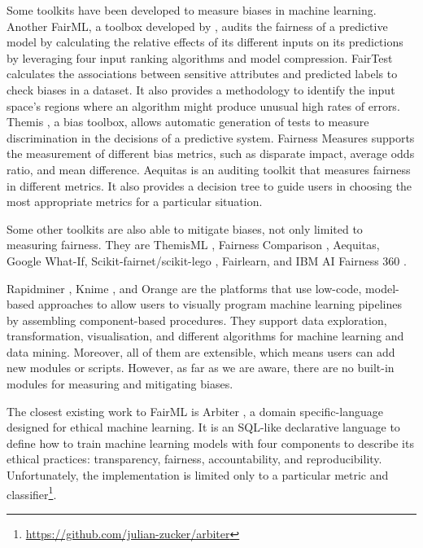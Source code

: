 \documentclass[sigconf,review]{acmart}
\begin{document}
Some toolkits have been developed to measure biases in machine learning. 
Another FairML, a toolbox developed by \cite{adebayo2016fairml}, audits the fairness of a predictive model by calculating the relative effects of its different inputs on its predictions by leveraging four input ranking algorithms and model compression. 
FairTest \cite{tramer2017fairtest} calculates the associations between sensitive attributes and predicted labels to check biases in a dataset. It also provides a methodology to identify the input space's regions where an algorithm might produce unusual high rates of errors.
Themis \cite{galhotra2017themis}, a bias toolbox, allows automatic generation of tests to measure discrimination in the decisions of a predictive system.
Fairness Measures \cite{zehlike2017fairness} supports the measurement of different bias metrics, such as disparate impact, average odds ratio, and mean difference. 
Aequitas \cite{saleiro2019aequitas} is an auditing toolkit that measures fairness in different metrics. It also provides a decision tree to guide users in choosing the most appropriate metrics for a particular situation. 

Some other toolkits are also able to mitigate biases, not only limited to measuring fairness. They are ThemisML \cite{bantilan2018themis}, Fairness Comparison \cite{friedler2019fairness}, Aequitas\cite{saleiro2019aequitas}, Google What-If\cite{googlewhatif2020}, Scikit-fairnet/scikit-lego \cite{scikitfairness2022,scikitlego2022}, Fairlearn\cite{bird2020fairlearn}, and IBM AI Fairness 360 \cite{bellamy2018ai}.

Rapidminer \cite{hofmann2016rapidminer}, Knime \cite{berthold2008knime}, and Orange \cite{demsar2013orange} are the platforms that use low-code, model-based approaches to allow users to visually program machine learning pipelines by assembling component-based procedures. They support data exploration, transformation, visualisation, and different algorithms for machine learning and data mining. Moreover, all of them are extensible, which means users can add new modules or scripts. However, as far as we are aware, there are no built-in modules for measuring and mitigating biases. 

The closest existing work to FairML is Arbiter \cite{zucker2020arbiter}, a domain specific-language designed for ethical machine learning. It is an SQL-like declarative language to define how to train machine learning models with four components to describe its ethical practices: transparency, fairness, accountability, and reproducibility. Unfortunately, the implementation is limited only to a particular metric and classifier\footnote{\url{https://github.com/julian-zucker/arbiter}}.
\end{document}
